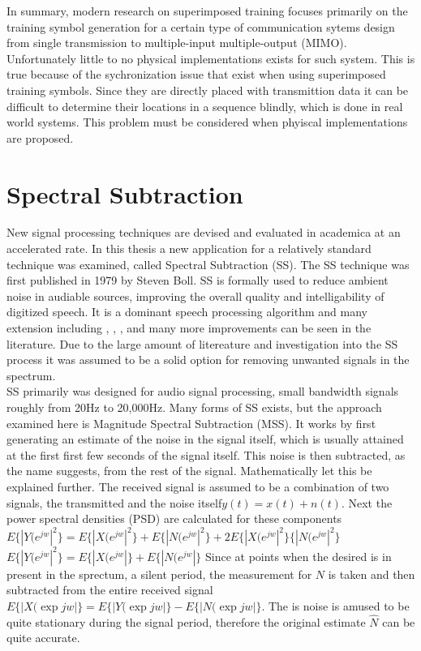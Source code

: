 In summary, modern research on superimposed training focuses primarily on the training symbol generation for a certain type of communication sytems design from single transmission to multiple-input multiple-output (MIMO).  Unfortunately little to no physical implementations exists for such system.  This is true because of the sychronization issue that exist when using superimposed training symbols.  Since they are directly placed with transmittion data it can be difficult to determine their locations in a sequence blindly, which is done in real world systems.  This problem must be considered when phyiscal implementations are proposed.\\

\section{Spectral Subtraction}

New signal processing techniques are devised and evaluated in academica at an accelerated rate\cite{TBD}.  In this thesis a new application for a relatively standard technique was examined, called Spectral Subtraction (SS).  The SS technique was first published in 1979 by Steven Boll\cite{boll}. SS is formally used to reduce ambient noise in audiable sources, improving the overall quality and intelligability of digitized speech.  It is a dominant speech processing algorithm and many extension including \cite{SSEXAMPLE}, \cite{SSEXAMPLE2}, \cite{SSEXAMPLE3}, and many more improvements can be seen in the literature.  Due to the large amount of litereature and investigation into the SS process it was assumed to be a solid option for removing unwanted signals in the spectrum.\\

SS primarily was designed for audio signal processing, small bandwidth signals roughly from 20Hz to 20,000Hz.  Many forms of SS exists, but the approach examined here is Magnitude Spectral Subtraction (MSS).  It works by first generating an estimate of the noise in the signal itself, which is usually attained at the first first few seconds of the signal itself.  This noise is then subtracted, as the name suggests, from the rest of the signal.  Mathematically let this be explained further.  The received signal is assumed to be a combination of two signals, the transmitted and the noise itself\(y(t) = x(t) + n(t)\).  Next the power spectral densities (PSD) are calculated for these components \( E\{|Y(e^{jw}|^{2}\}= E\{|X(e^{jw}|^{2}\} + E\{|N(e^{jw}|^{2}\} + 2E\{|X(e^{jw}|^{2}\}\{|N(e^{jw}|^{2}\}\)
\( E\{|Y(e^{jw}|^{2}\}= E\{|X(e^{jw}|\} + E\{|N(e^{jw}|\}  \)  
Since at points when the desired is in present in the sprectum, a silent period, the measurement for \(N\) is taken and then subtracted from the entire received signal \(E\{|X(\exp{jw}|\}= E\{|Y(\exp{jw}|\} - E\{|N(\exp{jw}|\}\).  The is noise is amused to be quite stationary during the signal period, therefore the original estimate \(\hat{N}\) can be quite accurate.\\

